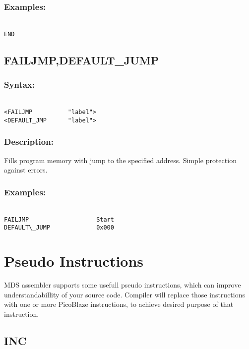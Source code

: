         \subsubsection{Examples:}
            {
                ~\\
                \usecodefont
                \verb'END'
            }

    \subsection{FAILJMP,DEFAULT\_JUMP}
        \subsubsection{Syntax:}
            {
                ~\\
                \usecodefont
                \verb'<FAILJMP          "label">'\\
                \verb'<DEFAULT_JMP      "label">'
            }
            
        \subsubsection{Description:}
        Fills program memory with jump to the specified address. Simple protection against errors.

        \subsubsection{Examples:}
            {
                ~\\
                \usecodefont
                \verb'FAILJMP                   Start'\\
                \verb'DEFAULT\_JUMP             0x000'\\
            }


\section{Pseudo Instructions}
MDS assembler supports some usefull pseudo instructions, which can improve understandabillity of your source code. Compiler will replace those instructions with one or more PicoBlaze instructions, to achieve desired purpose of that instruction.

    \subsection{INC}
